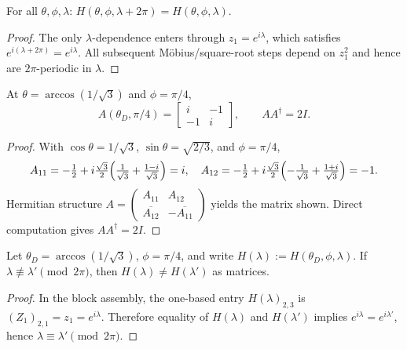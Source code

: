 \begin{lemma}
\label{lem:L2}
For all $\theta,\phi,\lambda$: $H(\theta,\phi,\lambda+2\pi)=H(\theta,\phi,\lambda)$.
\end{lemma}

\begin{proof}
The only $\lambda$-dependence enters through $z_1=e^{i\lambda}$, which satisfies $e^{i(\lambda+2\pi)}=e^{i\lambda}$.
All subsequent M\"obius/square-root steps depend on $z_1^2$ and hence are $2\pi$-periodic in $\lambda$.
\end{proof}

\begin{lemma}
\label{lem:L3}
At $\theta=\arccos(1/\sqrt3)$ and $\phi=\pi/4$,
\[
A(\theta_D,\pi/4)=
\begin{bmatrix} i & -1 \\ -1 & i \end{bmatrix},
\qquad AA^\dagger=2I.
\]
\end{lemma}

\begin{proof}
With $\cos\theta=1/\sqrt3$, $\sin\theta=\sqrt{2/3}$, and $\phi=\pi/4$,
\[
A_{11}=-\tfrac12+i\tfrac{\sqrt3}{2}\Bigl(\tfrac{1}{\sqrt3}+\tfrac{1-i}{\sqrt3}\Bigr)=i,\quad
A_{12}=-\tfrac12+i\tfrac{\sqrt3}{2}\Bigl(-\tfrac{1}{\sqrt3}+\tfrac{1+i}{\sqrt3}\Bigr)=-1.
\]
Hermitian structure $A=\begin{pmatrix}A_{11}&A_{12}\\ \overline{A_{12}}&-\overline{A_{11}}\end{pmatrix}$ yields the matrix shown.
Direct computation gives $AA^\dagger=2I$.
\end{proof}

\begin{lemma}
\label{lem:L4-matrix}
Let $\theta_D=\arccos(1/\sqrt3)$, $\phi=\pi/4$, and write $H(\lambda):=H(\theta_D,\phi,\lambda)$.
If $\lambda\not\equiv\lambda'\pmod{2\pi}$, then $H(\lambda)\neq H(\lambda')$ as matrices.
\end{lemma}

\begin{proof}
In the block assembly, the one-based entry $H(\lambda)_{2,3}$ is $(Z_1)_{2,1}=z_1=e^{i\lambda}$. Therefore equality of $H(\lambda)$ and $H(\lambda')$ implies $e^{i\lambda}=e^{i\lambda'}$, hence $\lambda\equiv\lambda'\pmod{2\pi}$.
\end{proof}

